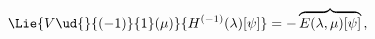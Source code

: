 \begin{equation*}
\Lie{V\ud{}{(-1)}{1}(\mu)}{H^{(-1)}(\lambda)[\psi]} = -
  \overbrace{E(\lambda,\mu)[\psi]}\,,
\end{equation*}

